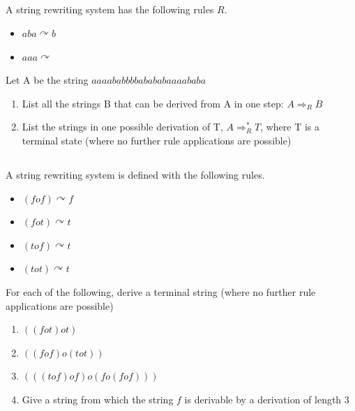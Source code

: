 \documentclass[twocolumn]{article}
\newcommand\mrk[1]{}
\begin{document}
\subsection{}

    A string rewriting system has the following rules $R$.

    \begin{itemize}
        \item $aba \curvearrowright b$
        \item $aaa \curvearrowright $
    \end{itemize}

    Let A be the string $aaaababbbbabababaaaababa$

    \begin{enumerate}
        \item List all the strings B that can be derived from A in one step: $A \Rightarrow_R B$ \mrk{1}
        \item List the strings in one possible derivation of T, $A \Rightarrow^*_R T$, where T is a terminal state (where no further rule applications are possible) \mrk{1}
    \end{enumerate}

\subsection{}

    A string rewriting system is defined with the following rules.

    \begin{multicols}{2}
    \begin{itemize}
        \item $(fof) \curvearrowright f$
        \item $(fot) \curvearrowright t$
        \item $(tof) \curvearrowright t$
        \item $(tot) \curvearrowright t$
    \end{itemize}
\end{multicols}

    For each of the following, derive a terminal string (where no further rule applications are possible)

    \begin{enumerate}
        \item $((fot)ot)$ \mrk{1}
        \item $((fof)o(tot))$ \mrk{1}
        \item $(((tof)of)o(fo(fof)))$ \mrk{1}
        \item Give a string from which the string $f$ is derivable by a derivation of length 3 \mrk{1}
    \end{enumerate}
\end{document}
